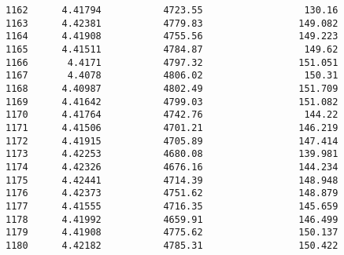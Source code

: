 \documentclass[11pt]{article}
\begin{document}
\begin{tcolorbox}[breakable, size=fbox, boxrule=.5pt, pad at break*=1mm, opacityfill=0]
\begin{Verbatim}[commandchars=\\\{\}]
1162      4.41794           4723.55                  130.16
1163      4.42381           4779.83                 149.082
1164      4.41908           4755.56                 149.223
1165      4.41511           4784.87                  149.62
1166       4.4171           4797.32                 151.051
1167       4.4078           4806.02                  150.31
1168      4.40987           4802.49                 151.709
1169      4.41642           4799.03                 151.082
1170      4.41764           4742.76                  144.22
1171      4.41506           4701.21                 146.219
1172      4.41915           4705.89                 147.414
1173      4.42253           4680.08                 139.981
1174      4.42326           4676.16                 144.234
1175      4.42441           4714.39                 148.948
1176      4.42373           4751.62                 148.879
1177      4.41555           4716.35                 145.659
1178      4.41992           4659.91                 146.499
1179      4.41908           4775.62                 150.137
1180      4.42182           4785.31                 150.422


\end{Verbatim}
\end{tcolorbox}
\end{document}
